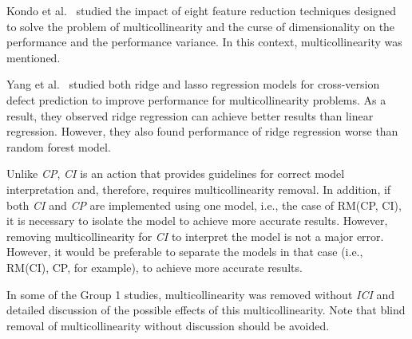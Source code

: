 
Kondo et al.~\cite{Kondo2019EMSEreduction} studied the impact of eight feature reduction techniques designed to solve the problem of multicollinearity and the curse of dimensionality on the performance and the performance variance. In this context, multicollinearity was mentioned.

Yang et al.~\cite{Yang2018TRRidge} studied both ridge and lasso regression models for cross-version defect prediction to improve performance for multicollinearity problems. As a result, they observed ridge regression can achieve better results than linear regression. However, they also found performance of ridge regression worse than random forest model.

Unlike \textit{CP}, \textit{CI} is an action that provides guidelines for correct model interpretation and, therefore, requires multicollinearity removal.
In addition, if both \textit{CI} and \textit{CP} are implemented using one model, i.e., the case of RM(CP, CI), it is necessary to isolate the model to achieve more accurate results. However, removing multicollinearity for \textit{CI} to interpret the model is not a major error. However, it would be preferable to separate the models in that case (i.e., RM(CI), CP, for example), to achieve more accurate results.

In some of the Group 1 studies,
multicollinearity was removed without \textit{ICI} and detailed discussion of the possible effects of this multicollinearity. Note that blind removal of multicollinearity without discussion should be avoided. 

